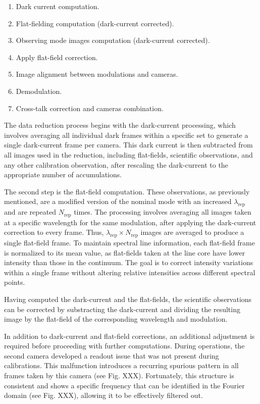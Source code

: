 \begin{enumerate}
  \item Dark current computation. 
  \item Flat-fielding computation (dark-current corrected).
  \item Observing mode images computation (dark-current corrected). 
  \item Apply flat-field correction.
  \item Image alignment between modulations and cameras. 
  \item Demodulation. 
  \item Cross-talk correction and cameras combination.
\end{enumerate}

The data reduction process begins with the dark-current processing, which involves averaging all individual dark frames within a specific set to generate a single dark-current frame per camera. This dark current is then subtracted from all images used in the reduction, including flat-fields, scientific observations, and any other calibration observation, after rescaling the dark-current to the appropriate number of accumulations.

The second step is the flat-field computation. These observations, as previously mentioned, are a modified version of the nominal mode with an increased $\lambda_{\text{rep}}$ and are repeated $N_{\text{rep}}$ times. The processing involves averaging all images taken at a specific wavelength for the same modulation, after applying the dark-current correction to every frame. Thus, $\lambda_{\text{rep}} \times N_{\text{rep}}$ images are averaged to produce a single flat-field frame. To maintain spectral line information, each flat-field frame is normalized to its mean value, as flat-fields taken at the line core have lower intensity than those in the continuum. The goal is to correct intensity variations within a single frame without altering relative intensities across different spectral points.

Having computed the dark-current and the flat-fields, the scientific observations can be corrected by substracting the dark-current and dividing the resulting image by the flat-field of the corresponding wavelength and modulation. 

In addition to dark-current and flat-field corrections, an additional adjustment is required before proceeding with further computations. During operations, the second camera developed a readout issue that was not present during calibrations. This malfunction introduces a recurring spurious pattern in all frames taken by this camera (see Fig. XXX). Fortunately, this structure is consistent and shows a specific frequency that can be identified in the Fourier domain (see Fig. XXX), allowing it to be effectively filtered out.    

